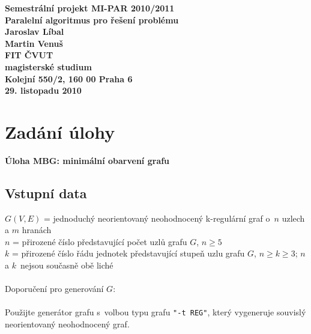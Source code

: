 \documentclass[12pt]{article}
\author{Martin Venuš, Jaroslav Líbal}
\begin{document}

\begin{center}
\bf Semestrální projekt MI-PAR 2010/2011\\[5mm]
    Paralelní algoritmus pro řešení problému\\[5mm]
       Jaroslav Líbal\\
       Martin Venuš\\[5mm]
FIT ČVUT\\[2mm]
magisterské studium\\[2mm]
Kolejní 550/2, 160 00 Praha 6\\[2mm]
29. listopadu 2010
\end{center}

\newpage
\tableofcontents
\newpage

\section{Zadání úlohy}
\textbf{Úloha MBG: minimální obarvení grafu}

\subsection{Vstupní data}

$G(V,E)$ = jednoduchý neorientovaný neohodnocený k-regulární graf o~$n$ uzlech a $m$ hranách\\
$n$ = přirozené číslo představující počet uzlů grafu $G$, $n \geq 5$\\
$k$ = přirozené číslo řádu jednotek představující stupeň uzlu grafu $G$, $n \geq k \geq 3$; $n$ a $k$~nejsou současně obě liché\\
\\
Doporučení pro generování $G$:\\
\\
Použijte generátor grafu s~volbou typu grafu \texttt{"-t REG"}, který vygeneruje souvislý neorientovaný neohodnocený graf.
\end{document}

